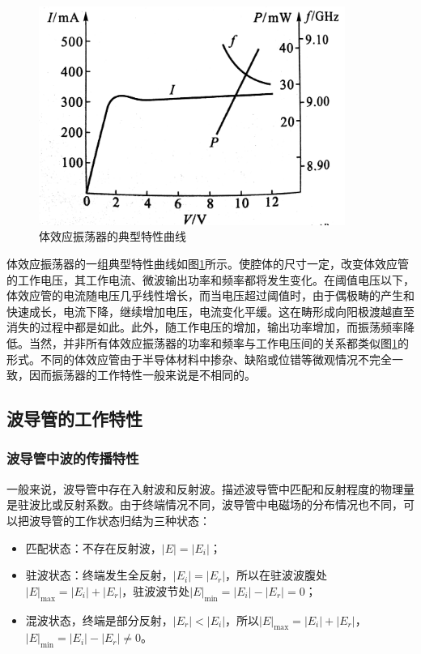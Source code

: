 \documentclass[aps,pre,12pt,preprint,onecolumn,showpacs,showkeys]{revtex4-1}
\begin{document}
    \begin{figure}[ht]
        \centering
        \includegraphics[width=100mm]{typical}
        \caption{\label{fig:typical}%
        体效应振荡器的典型特性曲线}
    \end{figure}

    体效应振荡器的一组典型特性曲线如图\ref{fig:typical}所示。使腔体的尺寸一定，改变体效应管的工作电压，其工作电流、微波输出功率和频率都将发生变化。在阈值电压以下，体效应管的电流随电压几乎线性增长，而当电压超过阈值时，由于偶极畴的产生和快速成长，电流下降，继续增加电压，电流变化平缓。这在畴形成向阳极渡越直至消失的过程中都是如此。此外，随工作电压的增加，输出功率增加，而振荡频率降低。当然，并非所有体效应振荡器的功率和频率与工作电压间的关系都类似图\ref{fig:typical}的形式。不同的体效应管由于半导体材料中掺杂、缺陷或位错等微观情况不完全一致，因而振荡器的工作特性一般来说是不相同的。

    \subsection{波导管的工作特性}
        \subsubsection{波导管中波的传播特性}
        一般来说，波导管中存在入射波和反射波。描述波导管中匹配和反射程度的物理量是驻波比或反射系数。由于终端情况不同，波导管中电磁场的分布情况也不同，可以把波导管的工作状态归结为三种状态：
        \begin{itemize}
            \item 匹配状态：不存在反射波，$|E|=|E_i|$；
            \item 驻波状态：终端发生全反射，$|E_i|=|E_r|$，所以在驻波波腹处$|E|_{\max}=|E_i|+|E_r|$，驻波波节处$|E|_{\min}=|E_i|-|E_r|=0$；
            \item 混波状态，终端是部分反射，$|E_r|<|E_i|$，所以$|E|_{\max}=|E_i|+|E_r|$， $|E|_{\min}=|E_i|-|E_r|\ne 0$。
        \end{itemize}
\end{document}
